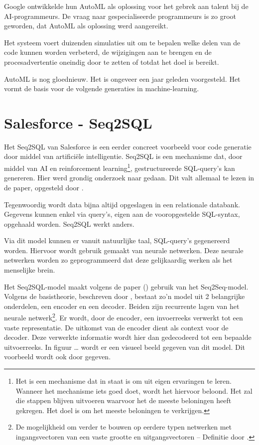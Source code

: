Google ontwikkelde hun AutoML als oplossing voor het gebrek aan talent bij de AI-programmeurs. De vraag naar gespecialiseerde programmeurs is zo groot geworden, dat AutoML als oplossing werd aangereikt. 

Het systeem voert duizenden simulaties uit om te bepalen welke delen van de code kunnen worden verbeterd, de wijzigingen aan te brengen en de procesadvertentie oneindig door te zetten of totdat het doel is bereikt. 
 
AutoML is nog gloednieuw. Het is ongeveer een jaar geleden voorgesteld. Het vormt de basis voor de volgende generaties in machine-learning.

\section{Salesforce - Seq2SQL}

Het Seq2SQL van Salesforce is een eerder concreet voorbeeld voor code generatie door middel van artificiële intelligentie. Seq2SQL is een mechanisme dat, door middel van AI en reinforcement learning\footnote{Het is een mechanisme dat in staat is om uit eigen ervaringen te leren. Wanneer het mechanisme iets goed doet, wordt het hiervoor beloond. Het zal die stappen blijven uitvoeren waarvoor het de meeste beloningen heeft gekregen. Het doel is om het meeste beloningen te verkrijgen.}, gestructureerde SQL-query’s kan genereren. Hier werd grondig onderzoek naar gedaan. Dit valt allemaal te lezen in de paper, opgesteld door \textcite{seq2sqlPaper}.

Tegenwoordig wordt data bijna altijd opgeslagen in een relationale databank. Gegevens kunnen enkel via query’s, eigen aan de vooropgestelde SQL-syntax, opgehaald worden. Seq2SQL werkt anders.

Via dit model kunnen er vanuit natuurlijke taal, SQL-query’s gegenereerd worden. Hiervoor wordt gebruik gemaakt van neurale netwerken. Deze neurale netwerken worden zo geprogrammeerd dat deze gelijkaardig werken als het menselijke brein. 

Het Seq2SQL-model maakt volgens de paper (\textcite{seq2sqlPaper}) gebruik van het Seq2Seq-model. Volgens de basistheorie, beschreven door \textcite{drnn}, bestaat zo’n model uit 2 belangrijke onderdelen, een encoder en een decoder. Beiden zijn recurrente lagen van het neurale netwerk\footnote{De mogelijkheid om verder te bouwen op eerdere typen netwerken met ingangsvectoren van een vaste grootte en uitgangsvectoren – Definitie door \textcite{rnn}.}. Er wordt, door de encoder, een invoerreeks verwerkt tot een vaste representatie. De uitkomst van de encoder dient als context voor de decoder. Deze verwerkte informatie wordt hier dan gedecodeerd tot een bepaalde uitvoerreeks. In figuur … wordt er een visueel beeld gegeven van dit model. Dit voorbeeld wordt ook door \textcite{drnn} gegeven.

